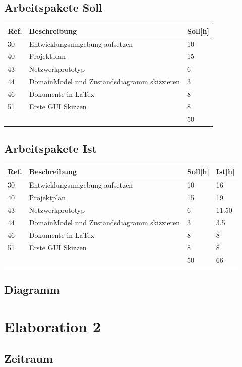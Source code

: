 \documentclass[11pt]{scrartcl}
\begin{document}
\subsection{Arbeitspakete Soll}
  \begin{tabularx} {\linewidth}{lXl}
    \bf{Ref.}  & \bf{Beschreibung} & \bf{Soll[h]} \\
    \hline
    30 & Entwicklungsumgebung aufsetzen & 10 \\
    40 & Projektplan & 15 \\
    43 & Netzwerkprototyp & 6 \\
    44 & DomainModel und Zustandsdiagramm skizzieren & 3 \\
    46 & Dokumente in LaTex & 8 \\
    51 & Erste GUI Skizzen & 8 \\
    \hline
    & & 50
  \end{tabularx}
  
  \subsection{Arbeitspakete Ist}
  \begin{tabularx} {\linewidth}{lXll}
    \bf{Ref.}  & \bf{Beschreibung} & \bf{Soll[h]}  & \bf{Ist[h]}\\
    \hline
    30 & Entwicklungsumgebung aufsetzen & 10 & 16 \\
    40 & Projektplan & 15 & 19\\
    43 & Netzwerkprototyp & 6 & 11.50\\
    44 & DomainModel und Zustandsdiagramm skizzieren & 3 & 3.5 \\
    46 & Dokumente in LaTex & 8 & 8\\
    51 & Erste GUI Skizzen & 8 & 8\\
    \hline
    & & 50 & 66
    \end{tabularx}
    
    
    \subsection{Diagramm}
    
\section{Elaboration 2}
\subsection{Zeitraum}
\end{document}
